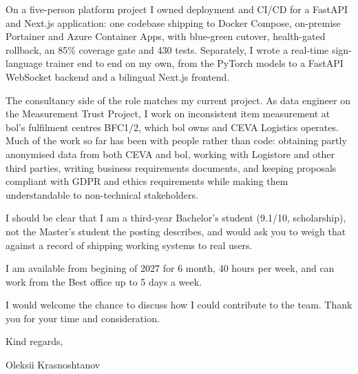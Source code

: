 \documentclass[letterpaper,11pt]{article}
\begin{document}
On a five-person platform project I owned deployment and CI/CD for a FastAPI
and Next.js application:
one codebase shipping to Docker Compose, on-premise Portainer and Azure
Container Apps, with blue-green cutover, health-gated rollback, an 85\%
coverage gate and 430 tests. Separately, I wrote a real-time sign-language
trainer end to end on my own, from the PyTorch models to a FastAPI WebSocket
backend and a bilingual Next.js frontend.

The consultancy side of the role matches my current project. As data engineer
on the Measurement Trust Project, I work on inconsistent item measurement at
bol's fulfilment centres BFC1/2, which bol owns and CEVA Logistics operates.
Much of the work so far has been with people rather than code: obtaining
partly anonymised data from both CEVA and bol, working with Logistore and other
third parties, writing business requirements documents, and keeping proposals
compliant with GDPR and ethics requirements while making them understandable
to non-technical stakeholders.

I should be clear that I am a third-year Bachelor's student (9.1/10,
scholarship), not the Master's student the posting describes, and would ask
you to weigh that against a record of shipping working systems to real users.

I am available from begining of 2027 for 6 month,
40 hours per week, and can work from the Best office
up to 5 days a week.


I would welcome the chance to discuss how I could contribute to the team.
Thank you for your time and consideration.

Kind regards,

Oleksii Krasnoshtanov
\end{document}
